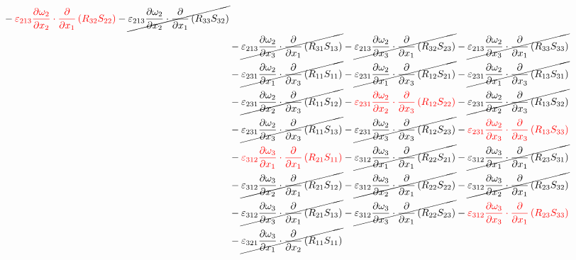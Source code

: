 \begin{equation}
\begin{split}
{}		-{\color{red}\varepsilon_{213}\pdv{\omega_{2}}{x_{2}}\cdot\pdv{}{x_{1}}\left(R_{32}S_{22}\right)
}		-\cancel{\varepsilon_{213}\pdv{\omega_{2}}{x_{2}}\cdot\pdv{}{x_{1}}\left(R_{33}S_{32}\right)
}\\ 
		&-\cancel{\varepsilon_{213}\pdv{\omega_{2}}{x_{3}}\cdot\pdv{}{x_{1}}\left(R_{31}S_{13}\right)
}		-\cancel{\varepsilon_{213}\pdv{\omega_{2}}{x_{3}}\cdot\pdv{}{x_{1}}\left(R_{32}S_{23}\right)
}		-\cancel{\varepsilon_{213}\pdv{\omega_{2}}{x_{3}}\cdot\pdv{}{x_{1}}\left(R_{33}S_{33}\right)
}\\ 
		&-\cancel{\varepsilon_{231}\pdv{\omega_{2}}{x_{1}}\cdot\pdv{}{x_{3}}\left(R_{11}S_{11}\right)
}		-\cancel{\varepsilon_{231}\pdv{\omega_{2}}{x_{1}}\cdot\pdv{}{x_{3}}\left(R_{12}S_{21}\right)
}		-\cancel{\varepsilon_{231}\pdv{\omega_{2}}{x_{1}}\cdot\pdv{}{x_{3}}\left(R_{13}S_{31}\right)
}\\ 
		&-\cancel{\varepsilon_{231}\pdv{\omega_{2}}{x_{2}}\cdot\pdv{}{x_{3}}\left(R_{11}S_{12}\right)
}		-{\color{red}\varepsilon_{231}\pdv{\omega_{2}}{x_{2}}\cdot\pdv{}{x_{3}}\left(R_{12}S_{22}\right)
}		-\cancel{\varepsilon_{231}\pdv{\omega_{2}}{x_{2}}\cdot\pdv{}{x_{3}}\left(R_{13}S_{32}\right)
}\\ 
		&-\cancel{\varepsilon_{231}\pdv{\omega_{2}}{x_{3}}\cdot\pdv{}{x_{3}}\left(R_{11}S_{13}\right)
}		-\cancel{\varepsilon_{231}\pdv{\omega_{2}}{x_{3}}\cdot\pdv{}{x_{3}}\left(R_{12}S_{23}\right)
}		-{\color{red}\varepsilon_{231}\pdv{\omega_{2}}{x_{3}}\cdot\pdv{}{x_{3}}\left(R_{13}S_{33}\right)
}\\ 
		&-{\color{red}\varepsilon_{312}\pdv{\omega_{3}}{x_{1}}\cdot\pdv{}{x_{1}}\left(R_{21}S_{11}\right)
}		-\cancel{\varepsilon_{312}\pdv{\omega_{3}}{x_{1}}\cdot\pdv{}{x_{1}}\left(R_{22}S_{21}\right)
}		-\cancel{\varepsilon_{312}\pdv{\omega_{3}}{x_{1}}\cdot\pdv{}{x_{1}}\left(R_{23}S_{31}\right)
}\\ 
		&-\cancel{\varepsilon_{312}\pdv{\omega_{3}}{x_{2}}\cdot\pdv{}{x_{1}}\left(R_{21}S_{12}\right)
}		-\cancel{\varepsilon_{312}\pdv{\omega_{3}}{x_{2}}\cdot\pdv{}{x_{1}}\left(R_{22}S_{22}\right)
}		-\cancel{\varepsilon_{312}\pdv{\omega_{3}}{x_{2}}\cdot\pdv{}{x_{1}}\left(R_{23}S_{32}\right)
}\\ 
		&-\cancel{\varepsilon_{312}\pdv{\omega_{3}}{x_{3}}\cdot\pdv{}{x_{1}}\left(R_{21}S_{13}\right)
}		-\cancel{\varepsilon_{312}\pdv{\omega_{3}}{x_{3}}\cdot\pdv{}{x_{1}}\left(R_{22}S_{23}\right)
}		-{\color{red}\varepsilon_{312}\pdv{\omega_{3}}{x_{3}}\cdot\pdv{}{x_{1}}\left(R_{23}S_{33}\right)
}\\ 
		&-\cancel{\varepsilon_{321}\pdv{\omega_{3}}{x_{1}}\cdot\pdv{}{x_{2}}\left(R_{11}S_{11}\right)
}
\end{split}
\end{equation}
